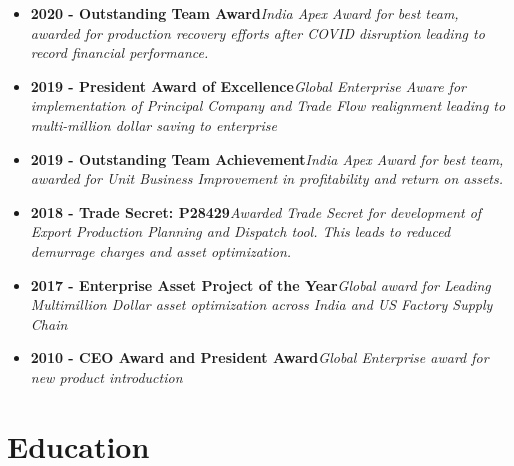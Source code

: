 \documentclass[11pt, a4paper]{awesome-cv}
\providecommand{\tightlist}{%
	\setlength{\itemsep}{0pt}\setlength{\parskip}{0pt}}
\begin{document}
\begin{itemize}
\tightlist
\item
  \textbf{2020 - Outstanding Team Award}\newline\textit{India Apex Award for best team, awarded for production recovery efforts after COVID disruption leading to record financial performance.}
\item
  \textbf{2019 - President Award of Excellence}\newline\textit{Global Enterprise Aware for implementation of Principal Company and Trade Flow realignment leading to multi-million dollar saving to enterprise}
\item
  \textbf{2019 - Outstanding Team Achievement}\newline\textit{India Apex Award for best team, awarded for Unit Business Improvement in profitability and return on assets.}
\item
  \textbf{2018 - Trade Secret: P28429}\newline\textit{Awarded Trade Secret for development of Export Production Planning and Dispatch tool. This leads to reduced demurrage charges and asset optimization.}
\item
  \textbf{2017 - Enterprise Asset Project of the Year}\newline\textit{Global award for Leading Multimillion Dollar asset optimization across India and US Factory Supply Chain}
\item
  \textbf{2010 - CEO Award and President Award}\newline\textit{Global Enterprise award for new product introduction}
\end{itemize}

\hypertarget{education}{%
\section{Education}\label{education}}
\end{document}
